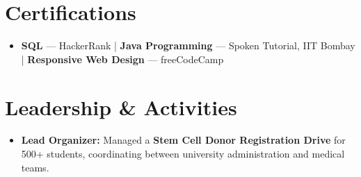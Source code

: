 \documentclass[a4paper,10.9pt]{article}
\begin{document}
\section{Certifications}
\begin{itemize}[leftmargin=1.5em, itemsep=2pt, parsep=0pt, topsep=2pt]
    \item \textbf{SQL} — HackerRank \quad | \quad \textbf{Java Programming} — Spoken Tutorial, IIT Bombay \quad | \quad \textbf{Responsive Web Design} — freeCodeCamp 
\end{itemize}


\section{Leadership \& Activities}
\begin{itemize}[leftmargin=1.5em, itemsep=2pt, parsep=0pt, topsep=2pt]
    \item \textbf{Lead Organizer:} Managed a \textbf{Stem Cell Donor Registration Drive} for 500+ students, coordinating between university administration and medical teams.
\end{itemize}
\end{document}
